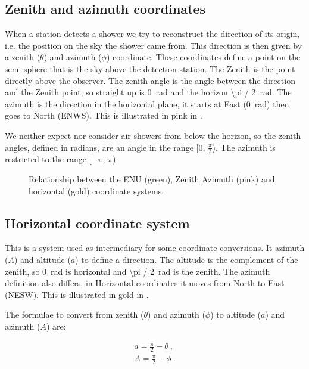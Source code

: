 \subsection{Zenith and azimuth coordinates}

When a station detects a shower we try to reconstruct the direction of
its origin, i.e. the position on the sky the shower came from. This
direction is then given by a zenith ($\theta$) and azimuth ($\phi$)
coordinate. These coordinates define a point on the semi-sphere that is
the sky above the detection station. The Zenith is the point directly
above the observer. The zenith angle is the angle between the direction
and the Zenith point, so straight up is \SI{0}{\radian} and the horizon
\SI{\pi / 2}{\radian}. The azimuth is the direction in the horizontal
plane, it starts at East (\SI{0}{\radian}) then goes to North (ENWS).
This is illustrated in pink in .

We neither expect nor consider air showers from below the horizon, so the
zenith angles, defined in radians, are an angle in the range [0,
$\frac{\pi}{2}$). The azimuth is restricted to the range [$-\pi$, $\pi$).

\begin{figure}
    \centering
    
    \caption{Relationship between the ENU (green), Zenith Azimuth (pink)
             and horizontal (gold) coordinate systems.}
    \label{fig:enu_horizontal}
\end{figure}


\subsection{Horizontal coordinate system}

This is a system used as intermediary for some coordinate conversions.
It azimuth ($A$) and altitude ($a$) to define a direction. The
altitude is the complement of the zenith, so \SI{0}{\radian} is horizontal
and \SI{\pi / 2}{\radian} is the zenith. The azimuth definition also
differs, in Horizontal coordinates it moves from North to East (NESW).
This is illustrated in gold in .

The formulae to convert from zenith ($\theta$) and azimuth ($\phi$) to
altitude ($a$) and azimuth ($A$) are:

\begin{equation}
    \begin{array}{l}
        a = \frac{\pi}{2} - \theta \ , \\
        A = \frac{\pi}{2} - \phi \ .
    \end{array}
\end{equation}

